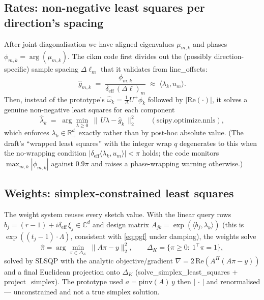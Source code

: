 \documentclass[11pt]{article}
\newcommand{\R}{\mathbb{R}}
\newcommand{\C}{\mathbb{C}}
\newcommand{\inner}[2]{\langle #1, #2 \rangle}
\newcommand{\lam}{\bm{\lambda}}
\newcommand{\Lam}{\bm{\Lambda}}
\newcommand{\bu}{\bm{u}}
\newcommand{\bt}{\bm{t}}
\newcommand{\bxi}{\bm{\xi}}
\newcommand{\bb}{\bm{b}}
\newcommand{\deff}{\delta_{\mathrm{eff}}}
\newcommand{\code}[1]{\texttt{\small #1}}
\def\code#1{#1}%
\def\small{}%
\def\bm#1{#1}%
\def\bt{t}%
\theoremstyle{definition}
\begin{document}
\subsection{Rates: non-negative least squares per direction's spacing}
After joint diagonalisation we have aligned eigenvalues $\mu_{m,k}$ and phases
$\phi_{m,k}=\arg(\mu_{m,k})$. The cikm code first divides out the (possibly direction-specific)
sample spacing $\Delta\ell_m$ that it validates from \code{line\_offsets}:
\begin{equation}
\widehat g_{m,k} \;=\; \frac{\phi_{m,k}}{\deff\,(\Delta\ell)_m}\;\approx\;\inner{\lam_k}{\bu_m}.
\end{equation}
Then, instead of the prototype's $\widehat{\bm\omega}_k=\tfrac1\Delta U^{+}\bm\phi_k$ followed by
$|\mathrm{Re}(\cdot)|$, it solves a genuine non-negative least squares for each component
\begin{equation}
\widehat\lam_k \;=\; \arg\min_{\lam\ge\bm 0}\ \big\|\,U\lam - \widehat{\bm g}_k\,\big\|_2^2
\qquad(\text{\code{scipy.optimize.nnls}}),
\label{eq:nnls}
\end{equation}
which enforces $\lam_k\in\R^d_+$ exactly rather than by post-hoc absolute value. (The draft's
``wrapped least squares'' with the integer wrap $\bm q$ degenerates to this when the
no-wrapping condition $|\deff\inner{\lam_k}{\bu_m}|<\pi$ holds; the code monitors
$\max_{m,k}|\phi_{m,k}|$ against $0.9\pi$ and raises a phase-wrapping warning otherwise.)

\subsection{Weights: simplex-constrained least squares}
The weight system reuses every sketch value. With the linear query rows
$\bb_j=(r-1)+i\deff\,\bxi_j\in\C^d$ and design matrix $A_{jk}=\exp(\inner{\bb_j}{\lam_k})$
(this is $\exp((\bt_j-1)\!\cdot\!\Lam)$, consistent with \eqref{eq:pgf} under damping), the
weights solve
\begin{equation}
\widehat{\bm\pi} = \arg\min_{\bm\pi\in\Delta_K}\ \big\|A\bm\pi - \bm y\big\|_2^2,
\qquad \Delta_K=\{\bm\pi\ge\bm0:\ \bm1^\top\bm\pi=1\},
\label{eq:simplex}
\end{equation}
solved by SLSQP with the analytic objective/gradient
$\nabla = 2\,\mathrm{Re}(A^{H}(A\bm\pi-\bm y))$ and a final Euclidean projection onto
$\Delta_K$ (\code{solve\_simplex\_least\_squares} + \code{project\_simplex}). The prototype used
$\bm a=\mathrm{pinv}(A)\,\bm y$ then $|\,\cdot\,|$ and renormalised --- unconstrained and not a
true simplex solution.
\end{document}

